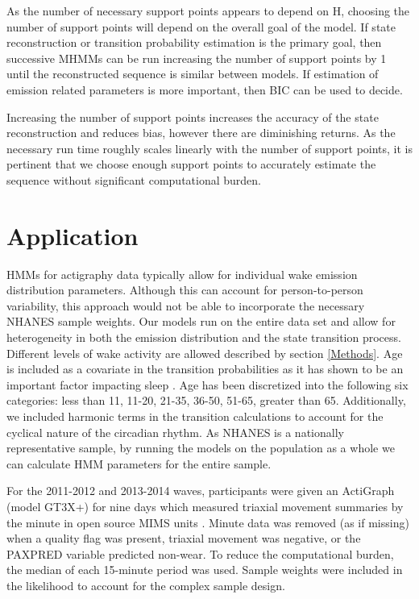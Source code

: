 \documentclass{article}
\begin{document}
As the number of necessary support points appears to depend on H, choosing the number of support points will depend on the overall goal of the model. If state reconstruction or transition probability estimation is the primary goal, then successive MHMMs can be run increasing the number of support points by 1 until the reconstructed sequence is similar between models. If estimation of emission related parameters is more important, then BIC can be used to decide.  

Increasing the number of support points increases the accuracy of the state reconstruction and reduces bias, however there are diminishing returns. As the necessary run time roughly scales linearly with the number of support points, it is pertinent that we choose enough support points to accurately estimate the sequence without significant computational burden. 

\pagebreak

\section{Application}

HMMs for actigraphy data typically allow for individual wake emission distribution parameters. Although this can account for person-to-person variability, this approach would not be able to incorporate the necessary NHANES sample weights. Our models run on the entire data set and allow for heterogeneity in both the emission distribution and the state transition process. Different levels of wake activity are allowed described by section \ref{Methods}. Age is included as a covariate in the transition probabilities as it has shown to be an important factor impacting sleep \cite{Redline2004,Boselli1998}. Age has been discretized into the following six categories: less than 11, 11-20, 21-35, 36-50, 51-65, greater than 65. Additionally, we included harmonic terms in the transition calculations to account for the cyclical nature of the circadian rhythm. As NHANES is a nationally representative sample, by running the models on the population as a whole we can calculate HMM parameters for the entire sample. 

For the 2011-2012 and 2013-2014 waves, participants were given an ActiGraph (model GT3X+) for nine days which measured triaxial movement summaries by the minute in open source MIMS units \cite{Dinesh2019}. Minute data was removed (as if missing) when a quality flag was present, triaxial movement was negative, or the PAXPRED variable predicted non-wear. To reduce the computational burden, the median of each 15-minute period was used. Sample weights were included in the likelihood \cite{Karchin1998} to account for the complex sample design. 
\end{document}

